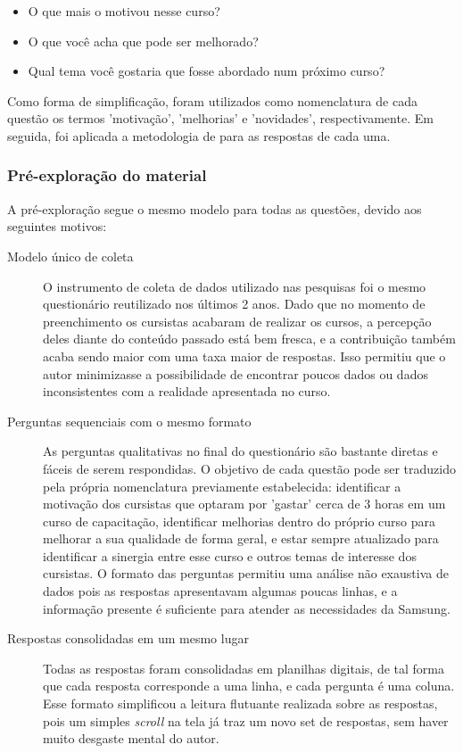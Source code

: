 \begin{itemize}
\item O que mais o motivou nesse curso?
\item O que você acha que pode ser melhorado?
\item Qual tema você gostaria que fosse abordado num próximo curso?
\end{itemize}

Como forma de simplificação, foram utilizados como nomenclatura de cada questão os termos 'motivação', 'melhorias' e 'novidades', respectivamente. Em seguida, foi aplicada a metodologia de  para as respostas de cada uma.

\subsubsection*{Pré-exploração do material}

A pré-exploração segue o mesmo modelo para todas as questões, devido aos seguintes motivos:

\begin{description}
\item[Modelo único de coleta] O instrumento de coleta de dados utilizado nas pesquisas foi o mesmo questionário reutilizado nos últimos 2 anos. Dado que no momento de preenchimento os cursistas acabaram de realizar os cursos, a percepção deles diante do conteúdo passado está bem fresca, e a contribuição também acaba sendo maior com uma taxa maior de respostas. Isso permitiu que o autor minimizasse a possibilidade de encontrar poucos dados ou dados inconsistentes com a realidade apresentada no curso.
\item[Perguntas sequenciais com o mesmo formato] As perguntas qualitativas no final do questionário são bastante diretas e fáceis de serem respondidas. O objetivo de cada questão pode ser traduzido pela própria nomenclatura previamente estabelecida: identificar a motivação dos cursistas que optaram por 'gastar' cerca de 3 horas em um curso de capacitação, identificar melhorias dentro do próprio curso para melhorar a sua qualidade de forma geral, e estar sempre atualizado para identificar a sinergia entre esse curso e outros temas de interesse dos cursistas. O formato das perguntas permitiu uma análise não exaustiva de dados pois as respostas apresentavam algumas poucas linhas, e a informação presente é suficiente para atender as necessidades da Samsung.
\item[Respostas consolidadas em um mesmo lugar] Todas as respostas foram consolidadas em planilhas digitais, de tal forma que cada resposta corresponde a uma linha, e cada pergunta é uma coluna. Esse formato simplificou a leitura flutuante realizada sobre as respostas, pois um simples \textit{scroll} na tela já traz um novo set de respostas, sem haver muito desgaste mental do autor.
\end{description}

